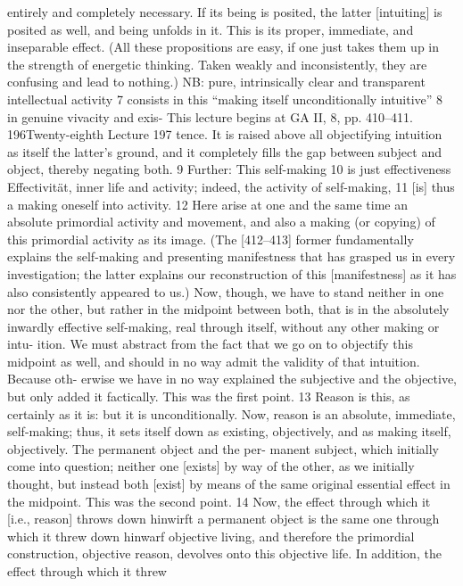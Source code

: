 entirely and completely necessary. If its being is posited, the latter [intuiting]
is posited as well, and being unfolds in it. This is its proper, immediate, and
inseparable effect. (All these propositions are easy, if one just takes them up in
the strength of energetic thinking. Taken weakly and inconsistently, they are
confusing and lead to nothing.)
NB: pure, intrinsically clear and transparent intellectual activity 7 consists
in this “making itself unconditionally intuitive” 8 in genuine vivacity and exis-
This lecture begins at GA II, 8, pp. 410–411.
196Twenty-eighth Lecture
197
tence. It is raised above all objectifying intuition as itself the latter’s ground, and
it completely fills the gap between subject and object, thereby negating both. 9
Further: This self-making 10 is just effectiveness {Effectivität}, inner life and
activity; indeed, the activity of self-making, 11 [is] thus a making oneself into
activity. 12 Here arise at one and the same time an absolute primordial activity
and movement, and also a making (or copying) of this primordial activity as
its image. (The [412–413] former fundamentally explains the self-making and
presenting manifestness that has grasped us in every investigation; the latter
explains our reconstruction of this [manifestness] as it has also consistently
appeared to us.) Now, though, we have to stand neither in one nor the other,
but rather in the midpoint between both, that is in the absolutely inwardly
effective self-making, real through itself, without any other making or intu-
ition. We must abstract from the fact that we go on to objectify this midpoint
as well, and should in no way admit the validity of that intuition. Because oth-
erwise we have in no way explained the subjective and the objective, but only
added it factically. This was the first point. 13
Reason is this, as certainly as it is: but it is unconditionally. Now, reason
is an absolute, immediate, self-making; thus, it sets itself down as existing,
objectively, and as making itself, objectively. The permanent object and the per-
manent subject, which initially come into question; neither one [exists] by way
of the other, as we initially thought, but instead both [exist] by means of the
same original essential effect in the midpoint. This was the second point. 14
Now, the effect through which it [i.e., reason] throws down {hinwirft} a
permanent object is the same one through which it threw down {hinwarf }
objective living, and therefore the primordial construction, objective reason,
devolves onto this objective life. In addition, the effect through which it threw
